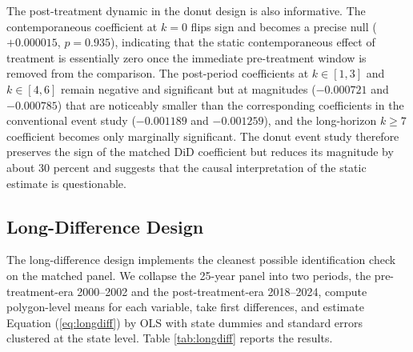 \documentclass[12pt, letterpaper]{article}
\begin{document}
The post-treatment dynamic in the donut design is also informative. The contemporaneous coefficient at $k = 0$ flips sign and becomes a precise null ($+0.000015$, $p = 0.935$), indicating that the static contemporaneous effect of treatment is essentially zero once the immediate pre-treatment window is removed from the comparison. The post-period coefficients at $k \in [1, 3]$ and $k \in [4, 6]$ remain negative and significant but at magnitudes ($-0.000721$ and $-0.000785$) that are noticeably smaller than the corresponding coefficients in the conventional event study ($-0.001189$ and $-0.001259$), and the long-horizon $k \geq 7$ coefficient becomes only marginally significant. The donut event study therefore preserves the sign of the matched DiD coefficient but reduces its magnitude by about 30 percent and suggests that the causal interpretation of the static estimate is questionable.

\subsection{Long-Difference Design}\label{sec:long_diff_results}

The long-difference design implements the cleanest possible identification check on the matched panel. We collapse the 25-year panel into two periods, the pre-treatment-era 2000--2002 and the post-treatment-era 2018--2024, compute polygon-level means for each variable, take first differences, and estimate Equation (\ref{eq:longdiff}) by OLS with state dummies and standard errors clustered at the state level. Table \ref{tab:longdiff} reports the results.
\end{document}

